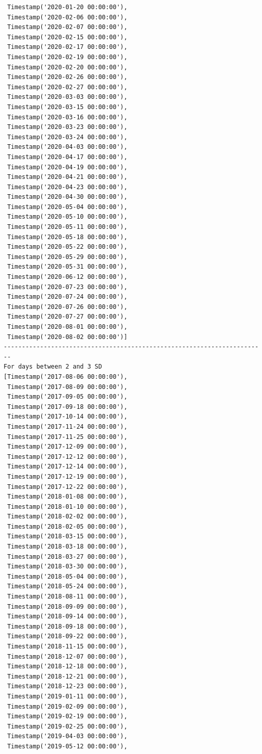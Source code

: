 \begin{verbatim}
 Timestamp('2020-01-20 00:00:00'),
 Timestamp('2020-02-06 00:00:00'),
 Timestamp('2020-02-07 00:00:00'),
 Timestamp('2020-02-15 00:00:00'),
 Timestamp('2020-02-17 00:00:00'),
 Timestamp('2020-02-19 00:00:00'),
 Timestamp('2020-02-20 00:00:00'),
 Timestamp('2020-02-26 00:00:00'),
 Timestamp('2020-02-27 00:00:00'),
 Timestamp('2020-03-03 00:00:00'),
 Timestamp('2020-03-15 00:00:00'),
 Timestamp('2020-03-16 00:00:00'),
 Timestamp('2020-03-23 00:00:00'),
 Timestamp('2020-03-24 00:00:00'),
 Timestamp('2020-04-03 00:00:00'),
 Timestamp('2020-04-17 00:00:00'),
 Timestamp('2020-04-19 00:00:00'),
 Timestamp('2020-04-21 00:00:00'),
 Timestamp('2020-04-23 00:00:00'),
 Timestamp('2020-04-30 00:00:00'),
 Timestamp('2020-05-04 00:00:00'),
 Timestamp('2020-05-10 00:00:00'),
 Timestamp('2020-05-11 00:00:00'),
 Timestamp('2020-05-18 00:00:00'),
 Timestamp('2020-05-22 00:00:00'),
 Timestamp('2020-05-29 00:00:00'),
 Timestamp('2020-05-31 00:00:00'),
 Timestamp('2020-06-12 00:00:00'),
 Timestamp('2020-07-23 00:00:00'),
 Timestamp('2020-07-24 00:00:00'),
 Timestamp('2020-07-26 00:00:00'),
 Timestamp('2020-07-27 00:00:00'),
 Timestamp('2020-08-01 00:00:00'),
 Timestamp('2020-08-02 00:00:00')]
------------------------------------------------------------------------
For days between 2 and 3 SD
[Timestamp('2017-08-06 00:00:00'),
 Timestamp('2017-08-09 00:00:00'),
 Timestamp('2017-09-05 00:00:00'),
 Timestamp('2017-09-18 00:00:00'),
 Timestamp('2017-10-14 00:00:00'),
 Timestamp('2017-11-24 00:00:00'),
 Timestamp('2017-11-25 00:00:00'),
 Timestamp('2017-12-09 00:00:00'),
 Timestamp('2017-12-12 00:00:00'),
 Timestamp('2017-12-14 00:00:00'),
 Timestamp('2017-12-19 00:00:00'),
 Timestamp('2017-12-22 00:00:00'),
 Timestamp('2018-01-08 00:00:00'),
 Timestamp('2018-01-10 00:00:00'),
 Timestamp('2018-02-02 00:00:00'),
 Timestamp('2018-02-05 00:00:00'),
 Timestamp('2018-03-15 00:00:00'),
 Timestamp('2018-03-18 00:00:00'),
 Timestamp('2018-03-27 00:00:00'),
 Timestamp('2018-03-30 00:00:00'),
 Timestamp('2018-05-04 00:00:00'),
 Timestamp('2018-05-24 00:00:00'),
 Timestamp('2018-08-11 00:00:00'),
 Timestamp('2018-09-09 00:00:00'),
 Timestamp('2018-09-14 00:00:00'),
 Timestamp('2018-09-18 00:00:00'),
 Timestamp('2018-09-22 00:00:00'),
 Timestamp('2018-11-15 00:00:00'),
 Timestamp('2018-12-07 00:00:00'),
 Timestamp('2018-12-18 00:00:00'),
 Timestamp('2018-12-21 00:00:00'),
 Timestamp('2018-12-23 00:00:00'),
 Timestamp('2019-01-11 00:00:00'),
 Timestamp('2019-02-09 00:00:00'),
 Timestamp('2019-02-19 00:00:00'),
 Timestamp('2019-02-25 00:00:00'),
 Timestamp('2019-04-03 00:00:00'),
 Timestamp('2019-05-12 00:00:00'),

\end{verbatim}
